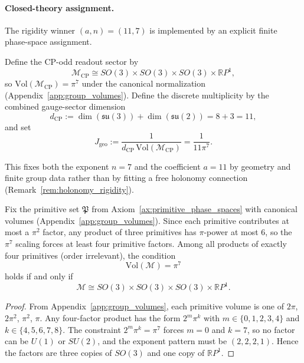 \paragraph{Closed-theory assignment.}
The rigidity winner $(a,n)=(11,7)$ is implemented by an explicit finite phase-space assignment.

\begin{axiom}\label{ax:cp_phase_space}
Define the CP-odd readout sector by
\begin{equation}
\mathcal{M}_{\mathrm{CP}}\cong SO(3)\times SO(3)\times SO(3)\times \mathbb{R}P^1,
\end{equation}
so $\mathrm{Vol}(\mathcal{M}_{\mathrm{CP}})=\pi^7$ under the canonical normalization (Appendix~\ref{app:group_volumes}). Define the discrete multiplicity by the combined gauge-sector dimension
\begin{equation}
d_{\mathrm{CP}}:=\dim(\mathfrak{su}(3))+\dim(\mathfrak{su}(2))=8+3=11,
\end{equation}
and set
\begin{equation}
J_{\mathrm{geo}}:=\frac{1}{d_{\mathrm{CP}}\,\mathrm{Vol}(\mathcal{M}_{\mathrm{CP}})}=\frac{1}{11\pi^7}.
\end{equation}
\end{axiom}

This fixes both the exponent $n=7$ and the coefficient $a=11$ by geometry and finite group data rather than by fitting a free holonomy connection (Remark~\ref{rem:holonomy_rigidity}).

\begin{proposition}\label{prop:cp_phase_factorization_rigidity}
Fix the primitive set $\mathfrak{P}$ from Axiom~\ref{ax:primitive_phase_spaces} with canonical volumes (Appendix~\ref{app:group_volumes}). Since each primitive contributes at most a $\pi^2$ factor, any product of three primitives has $\pi$-power at most $6$, so the $\pi^7$ scaling forces at least four primitive factors. Among all products of exactly four primitives (order irrelevant), the condition
\begin{equation}
\mathrm{Vol}(\mathcal{M})=\pi^7
\end{equation}
holds if and only if
\[
\mathcal{M}\cong SO(3)\times SO(3)\times SO(3)\times \mathbb{R}P^1.
\]
\end{proposition}
\begin{proof}
From Appendix~\ref{app:group_volumes}, each primitive volume is one of $2\pi$, $2\pi^2$, $\pi^2$, $\pi$. Any four-factor product has the form $2^{m}\pi^{k}$ with $m\in\{0,1,2,3,4\}$ and $k\in\{4,5,6,7,8\}$. The constraint $2^{m}\pi^{k}=\pi^7$ forces $m=0$ and $k=7$, so no factor can be $U(1)$ or $SU(2)$, and the exponent pattern must be $(2,2,2,1)$. Hence the factors are three copies of $SO(3)$ and one copy of $\mathbb{R}P^1$.
\end{proof}
